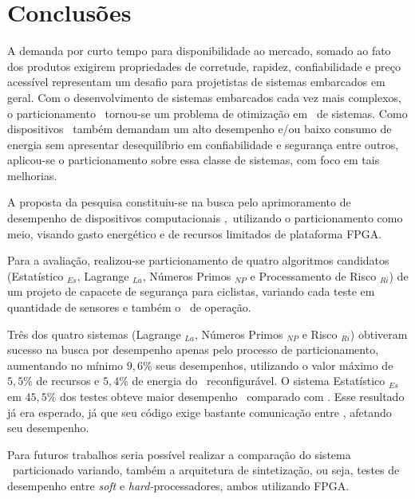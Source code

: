 \section{Conclusões} \label{chap:conclu}
    A demanda por curto tempo para disponibilidade ao mercado, somado ao fato dos produtos exigirem propriedades de corretude, rapidez, confiabilidade e preço acessível representam um desafio para projetistas de sistemas embarcados em geral.
    Com o desenvolvimento de sistemas embarcados cada vez mais complexos, o particionamento \hs\ tornou-se um problema de otimização em \codesign\ de sistemas.
    Como dispositivos \wearables\ também demandam um alto desempenho e/ou baixo consumo de energia sem apresentar desequilíbrio em confiabilidade e segurança entre outros, aplicou-se o particionamento sobre essa classe de sistemas, com foco em tais melhorias.
    
    A proposta da pesquisa constituiu-se na busca pelo aprimoramento de desempenho de dispositivos computacionais \wearables,\ utilizando o particionamento como meio, visando gasto energético e de recursos limitados de plataforma FPGA.
    
    Para a avaliação, realizou-se particionamento de quatro algoritmos candidatos (Estatístico \A$_{Es}$, Lagrange \A$_{La}$, Números Primos  \A$_{NP}$ e Processamento de Risco \A$_{Ri}$) de um projeto de capacete de segurança para ciclistas, variando cada teste em quantidade de sensores e também o \buffer\ de operação.
    
    Três dos quatro sistemas (Lagrange \Ss$_{La}$, Números Primos \Ss$_{NP}$ e Risco \Ss$_{Ri}$) obtiveram sucesso na busca por desempenho apenas pelo processo de particionamento, aumentando no mínimo $9,6\%$ seus desempenhos, utilizando o valor máximo de $ 5,5\% $ de recursos e $ 5,4\% $ de energia do \hardware\ reconfigurável.
    O sistema Estatístico \Ss$_{Es}$ em $45,5\%$ dos testes obteve maior desempenho \software\ comparado com \hardware.
    Esse resultado já era esperado, já que seu código exige bastante comunicação entre \hs, afetando seu desempenho.

    Para futuros trabalhos seria possível realizar a comparação do sistema \wearable\ particionado variando, também a arquitetura de sintetização, ou seja, testes de desempenho entre \textit{soft} e \textit{hard-}processadores, ambos utilizando FPGA.
    
